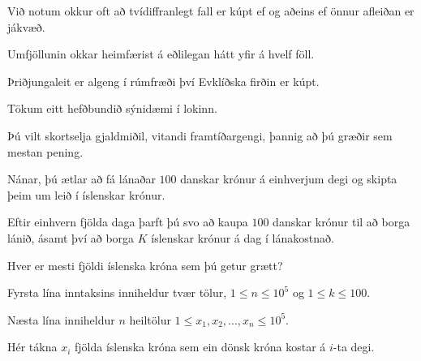 {{
    }
}

{
    {
        \item<1-> Við notum okkur oft að tvídiffranlegt fall er kúpt ef og aðeins ef önnur afleiðan er jákvæð.
        \item<2-> Umfjöllunin okkar heimfærist á eðlilegan hátt yfir á hvelf föll.
        \item<3-> Þriðjungaleit er algeng í rúmfræði því Evklíðska firðin er kúpt.
    }
}

{
}

{
    {
        \item<1-> Tökum eitt hefðbundið sýnidæmi í lokinn.
        \item<2-> Þú vilt skortselja gjaldmiðil, vitandi framtíðargengi, þannig að þú græðir sem mestan pening.
        \item<3-> Nánar, þú ætlar að fá lánaðar $100$ danskar krónur á einhverjum degi og skipta þeim um leið í íslenskar krónur.
        \item<4-> Eftir einhvern fjölda daga þarft þú svo að kaupa $100$ danskar krónur til að borga lánið,
                    ásamt því að borga $K$ íslenskar krónur á dag í lánakostnað.
        \item<5-> Hver er mesti fjöldi íslenska króna sem þú getur grætt?
        \item<6-> Fyrsta lína inntaksins inniheldur tvær tölur, $1 \leq n \leq 10^5$ og $1 \leq k \leq 100$.
        \item<7-> Næsta lína inniheldur $n$ heiltölur $1 \leq x_1, x_2, ..., x_n \leq 10^5$.
        \item<8-> Hér tákna $x_i$ fjölda íslenska króna sem ein dönsk króna kostar á $i$-ta degi.
    }
}

